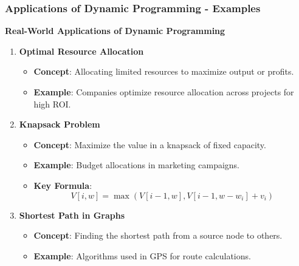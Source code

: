 \documentclass[aspectratio=169]{beamer}
\begin{document}
\begin{frame}[fragile]
    \frametitle{Applications of Dynamic Programming - Examples}
    
    \textbf{Real-World Applications of Dynamic Programming}
    
    \begin{enumerate}
        \item \textbf{Optimal Resource Allocation}
        \begin{itemize}
            \item \textbf{Concept}: Allocating limited resources to maximize output or profits.
            \item \textbf{Example}: Companies optimize resource allocation across projects for high ROI.
        \end{itemize}

        \item \textbf{Knapsack Problem}
        \begin{itemize}
            \item \textbf{Concept}: Maximize the value in a knapsack of fixed capacity.
            \item \textbf{Example}: Budget allocations in marketing campaigns.
            \item \textbf{Key Formula}:
            \begin{equation}
            V[i, w] = \max(V[i-1, w], V[i-1, w - w_i] + v_i)
            \end{equation}
        \end{itemize}
        
        \item \textbf{Shortest Path in Graphs}
        \begin{itemize}
            \item \textbf{Concept}: Finding the shortest path from a source node to others.
            \item \textbf{Example}: Algorithms used in GPS for route calculations.
        \end{itemize}
        
    \end{enumerate}
\end{frame}
\end{document}

